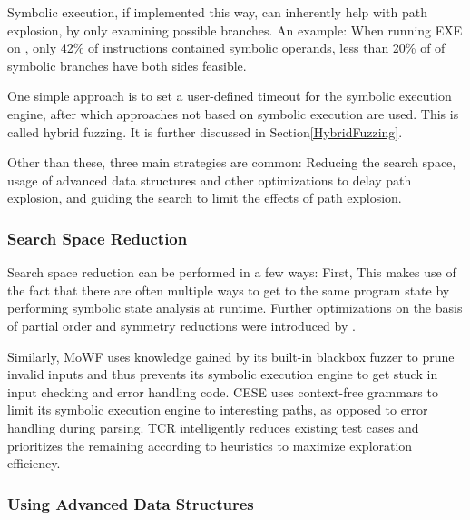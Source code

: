 \documentclass{article}
\begin{document}
\begin{multicols}{2}
    Symbolic execution, if implemented this way, can inherently help with path explosion, by only examining possible branches. An example: When running EXE\cite{EXE} on , only 42\% of instructions contained symbolic operands, less than 20\% of of symbolic branches have both sides feasible.\cite{EXE}

    One simple approach is to set a user-defined timeout for the symbolic execution engine, after which approaches not based on symbolic execution are used. This is called hybrid fuzzing\cite{HybridFuzzTesting}. It is further discussed in Section\ref{HybridFuzzing}.

    Other than these, three main strategies are common: Reducing the search space, usage of advanced data structures and other optimizations to delay path explosion, and guiding the search to limit the effects of path explosion.

    \subsubsection{Search Space Reduction}

    Search space reduction can be performed in a few ways: First, \cite{RWset} This makes use of the fact that there are often multiple ways to get to the same program state by performing symbolic state analysis at runtime. Further optimizations on the basis of partial order and symmetry reductions were introduced by \citeauthor{GSE}.\cite{GSE}

    Similarly, MoWF\cite{MoWF} uses knowledge gained by its built-in blackbox fuzzer to prune invalid inputs and thus prevents its symbolic execution engine to get stuck in input checking and error handling code. CESE\cite{CESE} uses context-free grammars to limit its symbolic execution engine to interesting paths, as opposed to error handling during parsing. TCR\cite{TCR} intelligently reduces existing test cases and prioritizes the remaining according to heuristics to maximize exploration efficiency.

    \subsubsection{Using Advanced Data Structures}
    \label{AdvancedDataStructures}


\end{multicols}
\end{document}
